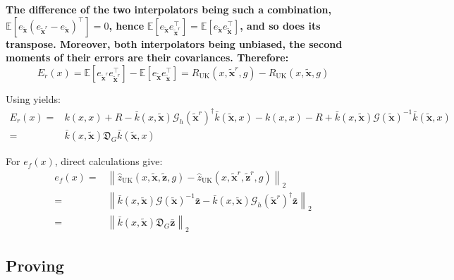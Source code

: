\documentclass[preprint]{elsarticle}
\begin{document}
\textbf{The difference of the two interpolators being such a combination,} $\mathbb{E}\left[e_{\tilde{\mathbf{x}}}\left(e_{\tilde{\mathbf{x}}^r}-e_{\tilde{\mathbf{x}}}\right)^\top\right]=0$\textbf{, hence} $\mathbb{E}\left[e_{\tilde{\mathbf{x}}}e_{\tilde{\mathbf{x}}^r}^\top\right]=\mathbb{E}\left[e_{\tilde{\mathbf{x}}}e_{\tilde{\mathbf{x}}}^\top\right]$\textbf{, and so does its transpose. Moreover, both interpolators being unbiased, the second moments of their errors are their covariances. Therefore:}
\begin{equation*}
    E_r(x)=\mathbb{E}\left[e_{\tilde{\mathbf{x}}^r}e_{\tilde{\mathbf{x}}^r}^\top\right]-\mathbb{E}\left[e_{\tilde{\mathbf{x}}}e_{\tilde{\mathbf{x}}}^\top\right]=R_{\mathrm{UK}}(x,\tilde{\mathbf{x}}^r,g)-R_{\mathrm{UK}}(x,\tilde{\mathbf{x}},g)
\end{equation*}

Using  yields:
\begin{equation*}
    \begin{aligned}
    E_r(x)=&k(x,x)+R-\bar{k}(x,\tilde{\mathbf{x}})\mathcal{G}_h(\tilde{\mathbf{x}}^r)^\dagger\bar{k}(\tilde{\mathbf{x}},x)-k(x,x)-R+\bar{k}(x,\tilde{\mathbf{x}})\mathcal{G}(\tilde{\mathbf{x}})^{-1}\bar{k}(\tilde{\mathbf{x}},x)\\
    =&\bar{k}(x,\tilde{\mathbf{x}})\mathfrak{D}_G\bar{k}(\tilde{\mathbf{x}},x)
    \end{aligned}
\end{equation*}

For $e_f(x)$, direct calculations give:
\begin{equation*}
    \begin{aligned}
    e_f(x)=&\left\|\hat{z}_{\mathrm{UK}}(x,\tilde{\mathbf{x}},\tilde{\mathbf{z}},g)-\hat{z}_{\mathrm{UK}}(x,\tilde{\mathbf{x}}^r,\tilde{\mathbf{z}}^r,g)\right\|_2\\
    =&\left\|\bar{k}(x,\tilde{\mathbf{x}})\mathcal{G}(\tilde{\mathbf{x}})^{-1}\bar{\mathbf{z}}-\bar{k}(x,\tilde{\mathbf{x}})\mathcal{G}_h(\tilde{\mathbf{x}}^r)^\dagger\bar{\mathbf{z}}\right\|_2\\
    =&\left\|\bar{k}(x,\tilde{\mathbf{x}})\mathfrak{D}_G\bar{\mathbf{z}}\right\|_2
    \end{aligned}
\end{equation*}

\subsection[]{Proving }\label{sec:explicit_residuals}
\end{document}
